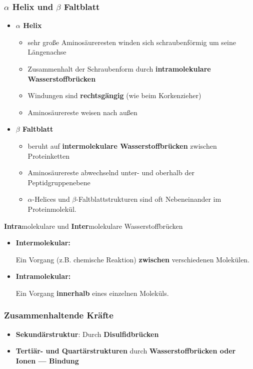 \documentclass[a4paper, 12pt]{scrartcl}
\begin{document}
\subsubsection{$\alpha$ Helix und $\beta$ Faltblatt}
\begin{itemize}
    \item \textbf{$\alpha$ Helix}

        \begin{itemize}
            \item sehr große Aminosäureresten winden sich schraubenförmig um
                seine Längenachse
            \item Zusammenhalt der Schraubenform durch \textbf{intramolekulare Wasserstoffbrücken}
            \item Windungen sind \textbf{rechtsgängig} (wie beim Korkenzieher)
            \item Aminosäurereste weisen nach außen
        \end{itemize}

    \item \textbf{$\beta$ Faltblatt}

        \begin{itemize}
            \item beruht auf \textbf{intermolekulare Wasserstoffbrücken}
                zwischen Proteinketten
            \item Aminosäurereste abwechselnd unter- und oberhalb der
                Peptidgruppenebene
            \item $\alpha$-Helices und $\beta$-Faltblattstrukturen sind oft
                Nebeneinander im Proteinmolekül.
        \end{itemize}
\end{itemize}
\begin{merke}{\textbf{Intra}molekulare und \textbf{Inter}molekulare
        Wasserstoffbrücken}
    \begin{itemize}
        \item \textbf{Intermolekular:}

            Ein Vorgang (z.B. chemische Reaktion) \textbf{zwischen}
            verschiedenen Molekülen.
        \item \textbf{Intramolekular:}

            Ein Vorgang \textbf{innerhalb} eines einzelnen Moleküls.
    \end{itemize}
\end{merke}
\subsubsection{Zusammenhaltende Kräfte}
\begin{itemize}
    \item \textbf{Sekundärstruktur}: Durch \textbf{Disulfidbrücken}
    \item \textbf{Tertiär- und Quartärstrukturen} durch
        \textbf{Wasserstoffbrücken oder Ionen --- Bindung}
\end{itemize}
\end{document}
